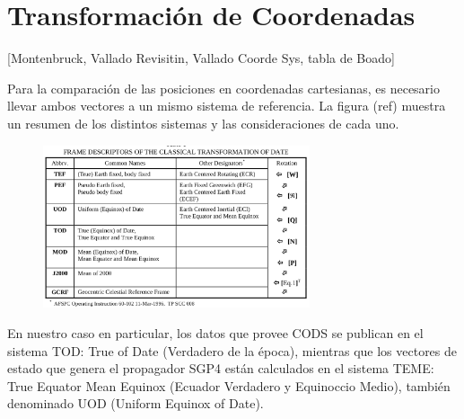 % 

\section{Transformaci\'on de Coordenadas}
[Montenbruck, Vallado Revisitin, Vallado Coorde Sys, tabla de Boado]

Para la comparaci\'on de las posiciones en coordenadas cartesianas, es necesario llevar ambos vectores a un mismo sistema de referencia.
La figura (ref) muestra un resumen de los distintos sistemas y las consideraciones de cada uno. 

\begin{figure}
  \centering
  \includegraphics[width=0.7\textwidth]{imagenes/sistReferencias}
\end{figure}



En nuestro caso en particular, los datos que provee CODS se publican en el sistema TOD: True of Date (Verdadero de la \'epoca), mientras que los vectores de estado que genera el propagador SGP4 est\'an calculados en el sistema TEME: True Equator Mean Equinox (Ecuador Verdadero y Equinoccio Medio), tambi\'en denominado UOD (Uniform Equinox of Date).

